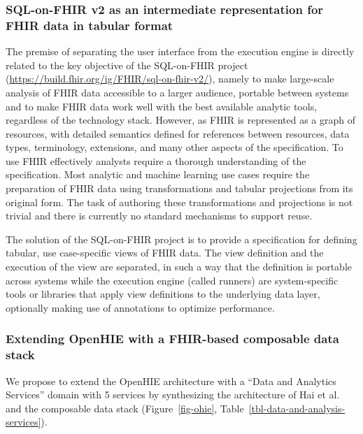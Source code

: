 \documentclass[
  authoryear]{elsarticle}
\begin{document}
\subsubsection{SQL-on-FHIR v2 as an intermediate representation for FHIR
data in tabular
format}\label{sql-on-fhir-v2-as-an-intermediate-representation-for-fhir-data-in-tabular-format}

The premise of separating the user interface from the execution engine
is directly related to the key objective of the SQL-on-FHIR project
(\url{https://build.fhir.org/ig/FHIR/sql-on-fhir-v2/}), namely to make
large-scale analysis of FHIR data accessible to a larger audience,
portable between systems and to make FHIR data work well with the best
available analytic tools, regardless of the technology stack. However,
as FHIR is represented as a graph of resources, with detailed semantics
defined for references between resources, data types, terminology,
extensions, and many other aspects of the specification. To use FHIR
effectively analysts require a thorough understanding of the
specification. Most analytic and machine learning use cases require the
preparation of FHIR data using transformations and tabular projections
from its original form. The task of authoring these transformations and
projections is not trivial and there is currently no standard mechanisms
to support reuse.

The solution of the SQL-on-FHIR project is to provide a specification
for defining tabular, use case-specific views of FHIR data. The view
definition and the execution of the view are separated, in such a way
that the definition is portable across systems while the execution
engine (called runners) are system-specific tools or libraries that
apply view definitions to the underlying data layer, optionally making
use of annotations to optimize performance.

\subsubsection{Extending OpenHIE with a FHIR-based composable data
stack}\label{extending-openhie-with-a-fhir-based-composable-data-stack}

We propose to extend the OpenHIE architecture with a ``Data and
Analytics Services'' domain with 5 services by synthesizing the
architecture of Hai et al. \citep{hai2023data} and the composable data
stack \citep{pedreira2023composable} (Figure~\ref{fig-ohie},
Table~\ref{tbl-data-and-analysis-services}).
\end{document}

